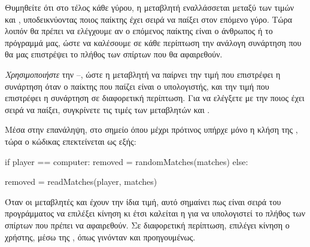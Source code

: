 \documentclass[a4paper,11pt,oneside]{book}
\begin{document}
\begin{step}
Θυμηθείτε ότι στο τέλος κάθε γύρου, η μεταβλητή  εναλλάσσεται μεταξύ των τιμών  και , υποδεικνύοντας ποιος παίκτης έχει σειρά να παίξει στον επόμενο γύρο. Τώρα λοιπόν θα πρέπει να ελέγχουμε αν ο επόμενος παίκτης είναι ο άνθρωπος ή το πρόγραμμά μας, ώστε να καλέσουμε σε κάθε περίπτωση την ανάλογη συνάρτηση που θα μας επιστρέψει το πλήθος των σπίρτων που θα αφαιρεθούν.

\emph{Χρησιμοποιήστε} την --, ώστε η μεταβλητή  να παίρνει την τιμή που επιστρέφει η συνάρτηση  όταν ο παίκτης που παίζει είναι ο υπολογιστής, και την τιμή που επιστρέφει η συνάρτηση  σε διαφορετική περίπτωση. 
Για να ελέγξετε με την  ποιος έχει σειρά να παίξει, συγκρίνετε τις τιμές των μεταβλητών  και .

\begin{answer}
Μέσα στην επανάληψη, στο σημείο όπου μέχρι πρότινος υπήρχε μόνο η κλήση της , τώρα ο κώδικας επεκτείνεται ως εξής:

\begin{pynew}
    if player == computer:
        removed = randomMatches(matches)
    else:
\end{pynew}
\begin{pyplain}
        removed = readMatches(player, matches)    
\end{pyplain}

Όταν οι μεταβλητές  και  έχουν την ίδια τιμή, αυτό σημαίνει πως είναι σειρά του προγράμματος να επιλέξει κίνηση κι έτσι καλείται η  για να υπολογιστεί το πλήθος των σπίρτων που πρέπει να αφαιρεθούν. Σε διαφορετική περίπτωση, επιλέγει κίνηση ο χρήστης, μέσω της , όπως γινόνταν και προηγουμένως.
\end{answer}
\end{step}
\end{document}

